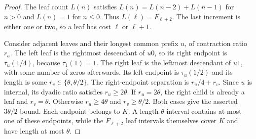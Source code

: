 \begin{proof}
The leaf count $L(n)$ satisfies $L(n)=L(n-2)+L(n-1)$ for $n>0$ and
$L(n)=1$ for $n\le0$. Thus $L(\ell)=F_{\ell+2}$. The last increment
is either one or two, so a leaf has cost $\ell$ or $\ell+1$.

Consider adjacent leaves and their longest common prefix $u$, of
contraction ratio $r_u$. The left leaf is the rightmost descendant of
$u0$, so its right endpoint is $\tau_u(1/4)$, because $\tau_1(1)=1$.
The right leaf is the leftmost descendant of $u1$, with some number of
zeros afterwards. Its left endpoint is $\tau_u(1/2)$ and its length is
some $r_v\in\{\theta,\theta/2\}$. The right-endpoint separation is
$r_u/4+r_v$. Since $u$ is internal, its dyadic ratio satisfies
$r_u\ge2\theta$. If $r_u=2\theta$, the right child is already a leaf
and $r_v=\theta$. Otherwise $r_u\ge4\theta$ and $r_v\ge\theta/2$.
Both cases give the asserted $3\theta/2$ bound.
Each endpoint belongs to $K$. A length-$\theta$ interval contains at
most one of these endpoints, while the $F_{\ell+2}$ leaf intervals
themselves cover $K$ and have length at most $\theta$.
\end{proof}
